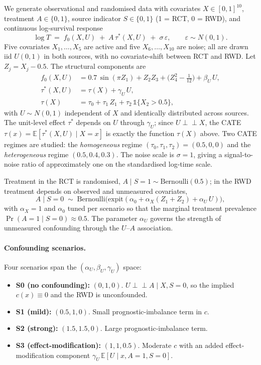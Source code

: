 \documentclass[11pt]{article}
\theoremstyle{plain}
\theoremstyle{definition}
\theoremstyle{remark}
\newcommand{\E}{\mathbb{E}}
\newcommand{\1}{\mathds{1}}
\newcommand{\indep}{\perp\!\!\!\perp}
\begin{document}
We generate observational and randomised data with covariates
$X \in [0,1]^{10}$, treatment $A \in \{0,1\}$, source indicator
$S \in \{0,1\}$ (1 = RCT, 0 = RWD), and continuous log-survival response
\[
  \log T \;=\; f_0(X, U) \;+\; A\, \tau^*(X, U) \;+\; \sigma\, \varepsilon,
  \qquad \varepsilon \sim N(0, 1).
\]
Five covariates $X_1, \ldots, X_5$ are active and five $X_6, \ldots, X_{10}$
are noise; all are drawn iid $U(0, 1)$ in both sources, with no
covariate-shift between RCT and RWD. Let $Z_j = X_j - 0.5$. The structural
components are
\begin{align*}
  f_0(X, U)    &= 0.7\, \sin(\pi Z_1) + Z_2 Z_3 + \bigl(Z_4^2 - \tfrac{1}{12}\bigr) + \beta_U\, U, \\
  \tau^*(X, U) &= \tau(X) + \gamma_U\, U, \\
  \tau(X)      &= \tau_0 + \tau_1\, Z_1 + \tau_2\, \1\{X_2 > 0.5\},
\end{align*}
with $U \sim N(0, 1)$ independent of $X$ and identically distributed across
sources. The unit-level effect $\tau^*$ depends on $U$ through $\gamma_U$;
since $U \indep X$, the CATE $\tau(x) = \E[\tau^*(X, U) \mid X = x]$ is
exactly the function $\tau(X)$ above. Two CATE regimes are studied: the
\emph{homogeneous} regime $(\tau_0, \tau_1, \tau_2) = (0.5, 0, 0)$ and the
\emph{heterogeneous} regime $(0.5, 0.4, 0.3)$. The noise scale is
$\sigma = 1$, giving a signal-to-noise ratio of approximately one on the
standardised log-time scale.

Treatment in the RCT is randomised, $A \mid S = 1 \sim \mathrm{Bernoulli}(0.5)$;
in the RWD treatment depends on observed and unmeasured covariates,
\[
  A \mid S = 0 \;\sim\; \mathrm{Bernoulli}\bigl(\mathrm{expit}(\alpha_0 + \alpha_X(Z_1 + Z_2) + \alpha_U\, U)\bigr),
\]
with $\alpha_X = 1$ and $\alpha_0$ tuned per scenario so that the marginal
treatment prevalence $\Pr(A = 1 \mid S = 0) \approx 0.5$. The parameter
$\alpha_U$ governs the strength of unmeasured confounding through the
$U$--$A$ association.

\paragraph{Confounding scenarios.}
Four scenarios span the $(\alpha_U, \beta_U, \gamma_U)$ space:
\begin{itemize}
  \item \textbf{S0 (no confounding):} $(0, 1, 0)$. $U \indep A \mid X, S = 0$,
    so the implied $c(x) \equiv 0$ and the RWD is unconfounded.
  \item \textbf{S1 (mild):} $(0.5, 1, 0)$. Small prognostic-imbalance term in
    $c$.
  \item \textbf{S2 (strong):} $(1.5, 1.5, 0)$. Large prognostic-imbalance
    term.
  \item \textbf{S3 (effect-modification):} $(1, 1, 0.5)$. Moderate $c$ with
    an added effect-modification component
    $\gamma_U\, \E[U \mid x, A = 1, S = 0]$.
\end{itemize}
\end{document}
